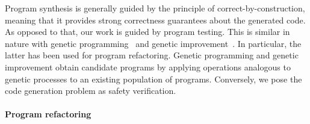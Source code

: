 \documentclass[sigconf,review,anonymous]{acmart}
\begin{document}





Program synthesis is generally guided by the principle of correct-by-construction, meaning that it provides strong correctness guarantees about the generated code.
As opposed to that, our work is guided by program testing. This is similar in nature with genetic programming~\cite{Koza92} and genetic improvement~\cite{DBLP:journals/dagstuhl-reports/PetkeGFL18,7911210}. In particular, the latter has been used for program refactoring. Genetic programming and genetic improvement obtain candidate programs by applying operations analogous to genetic processes to an existing population of programs. Conversely, we pose the code generation problem as safety verification.





\paragraph{Program refactoring}
\end{document}
